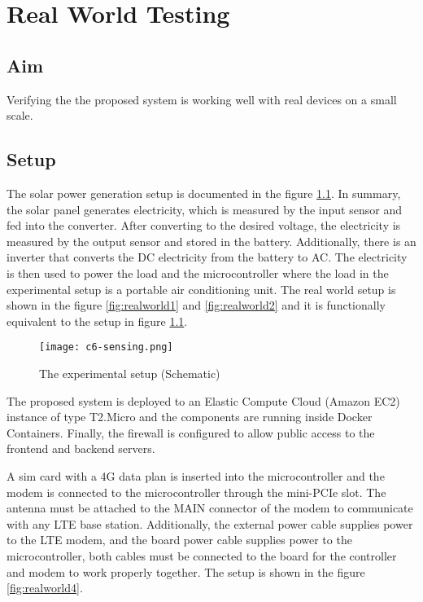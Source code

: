 \documentclass[../thesis.tex]{subfiles}
\begin{document}
\chapter{Real World Testing}

\section{Aim}

Verifying the the proposed system is working well with real devices on a small scale.

\section{Setup} %

The solar power generation setup is documented in the figure \ref{fig:realworldsensing}. In summary, the solar panel generates electricity, which is measured by the input sensor and fed into the converter. After converting to the desired voltage, the electricity is measured by the output sensor and stored in the battery. Additionally, there is an inverter that converts the DC electricity from the battery to AC. The electricity is then used to power the load and the microcontroller where the load in the experimental setup is a portable air conditioning unit. The real world setup is shown in the figure \ref{fig:realworld1} and \ref{fig:realworld2} and it is functionally equivalent to the setup in figure \ref{fig:realworldsensing}.

\begin{figure}[!ht]
	\centering
	\texttt{[image: c6-sensing.png]}
	\caption{The experimental setup (Schematic)}
	\label{fig:realworldsensing}
\end{figure}

The proposed system is deployed to an Elastic Compute Cloud (Amazon EC2) instance of type T2.Micro and the components are running inside Docker Containers. Finally, the firewall is configured to allow public access to the frontend and backend servers. 

A sim card with a 4G data plan is inserted into the microcontroller and the modem is connected to the microcontroller through the mini-PCIe slot. The antenna must be attached to the MAIN connector of the modem to communicate with any LTE base station. Additionally, the external power cable supplies power to the LTE modem, and the board power cable supplies power to the microcontroller, both cables must be connected to the board for the controller and modem to work properly together. The setup is shown in the figure \ref{fig:realworld4}. 
\end{document}
